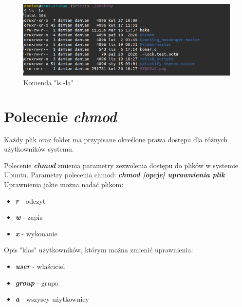 \documentclass{article}
\begin{document}
\begin{figure}[H]
    \centering
    \hspace*{-1cm}
    \includegraphics[totalheight=4cm]{data/ls-la.png}
    \caption{Komenda "ls -la"}
    \label{2}
\end{figure}



\section{Polecenie \emph{\textit{chmod}}}
Każdy plik oraz folder ma przypisane określone prawa dostępu dla różnych użytkowników systemu.\par
Polecenie \emph{\textbf{chmod}} zmienia parametry zezwolenia dostępu do plików w systemie Ubuntu.
Parametry polecenia chmod:
\emph{\textbf{chmod [opcje] uprawnienia plik}}\\

Uprawnienia jakie można nadać plikom:
\begin{itemize}
    \item \emph{\textbf{r}} - odczyt
    \item \emph{\textbf{w}} - zapis
    \item \emph{\textbf{x}} - wykonanie
\end{itemize}

Opis "klas" użytkowników, którym można zmienić uprawnienia:
\begin{itemize}
    \item  \emph{\textbf{user}} - właściciel
    \item  \emph{\textbf{group}} - grupa
    \item  \emph{\textbf{a}} - wszyscy użytkownicy
\end{itemize}
\end{document}
